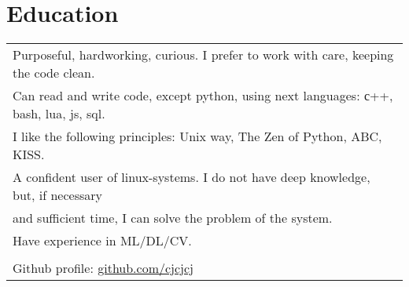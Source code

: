 \documentclass[a4paper,10pt]{article}
\begin{document}
\section{Education}
\begin{tabularx}{\textwidth}{l} %
Purposeful, hardworking, curious. I prefer to work with care, keeping the code clean. \\
Can read and write code, except python, using next languages: с++, bash, lua, js, sql. \\
I like the following principles: Unix way, The Zen of Python, ABC, KISS. \\
A confident user of linux-systems. I do not have deep knowledge, but, if necessary\\and sufficient time, I can solve the problem of the system. \\
Have experience in ML/DL/CV. \\
\\
Github profile: \href{https://github.com/cjcjcj}{github.com/cjcjcj} 
\end{tabularx}
\end{document}
